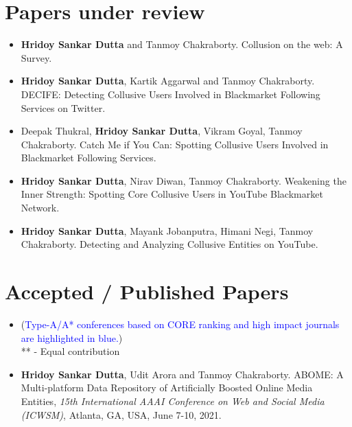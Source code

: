 \documentclass[margin, centered]{res}
\begin{document}
\begin{resume}
\section{Papers under review}
\begin{itemize}[leftmargin=*]






\item \textbf{Hridoy Sankar Dutta} and Tanmoy Chakraborty. Collusion on the web: A Survey.

\item \textbf{Hridoy Sankar Dutta}, Kartik Aggarwal and Tanmoy Chakraborty. DECIFE: Detecting Collusive Users Involved in Blackmarket Following Services on Twitter.

\item Deepak Thukral, \textbf{Hridoy Sankar Dutta}, Vikram Goyal, Tanmoy Chakraborty. Catch Me if You Can: Spotting Collusive Users Involved in Blackmarket Following Services.

\item \textbf{Hridoy Sankar Dutta}, Nirav Diwan, Tanmoy Chakraborty. Weakening the Inner Strength: Spotting Core Collusive Users in YouTube Blackmarket Network.

\item \textbf{Hridoy Sankar Dutta}, Mayank Jobanputra, Himani Negi, Tanmoy Chakraborty. Detecting and Analyzing Collusive Entities on YouTube.

\end{itemize}

\section{Accepted / Published Papers}
\begin{itemize}[leftmargin=*]
\item[] (\textcolor{blue}{Type-A/A* conferences based on CORE ranking and high impact journals are highlighted in blue.}) \\ ** - Equal contribution

\item \textbf{Hridoy Sankar Dutta}, Udit Arora and Tanmoy Chakraborty. ABOME: A Multi-platform Data Repository of Artificially Boosted Online Media Entities, \textit{15th International AAAI Conference on Web and Social Media (ICWSM)}, Atlanta, GA, USA, June 7-10, 2021.


\end{itemize}
\end{resume}
\end{document}

